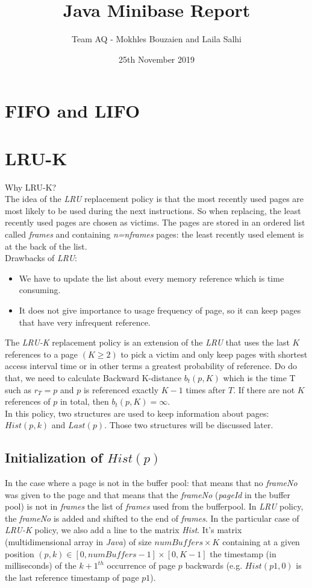 \documentclass{article}
\title{Java Minibase Report}
\author{Team AQ - Mokhles Bouzaien and Laila Salhi}
\date{25th November 2019}
\begin{document}
\maketitle

\section{FIFO and LIFO}


\section{LRU-K}
Why LRU-K?\\
The idea of the \textit{LRU} replacement policy is that the most recently used pages are most likely to be used during the next instructions. So when replacing, the least recently used pages are chosen as victims. The pages are stored in an ordered list called \textit{frames} and containing \textit{n=nframes} pages: the least recently used element is at the back of the list.\\
Drawbacks of \textit{LRU}:
\begin{itemize}
  \item We have to update the list about every memory reference which is time consuming.
  \item It does not give importance to usage frequency of page, so it can keep pages that have very infrequent reference.
\end{itemize}
The \textit{LRU-K} replacement policy is an extension of the \textit{LRU} that uses the last $K$ references to a page $(K\geq2)$ to pick a victim and only keep pages with shortest access interval time or in other terms a greatest probability of reference. Do do that, we need to calculate Backward K-distance $b_t(p,K)$ which is the time T such as $r_T=p$ and $p$ is referenced exactly $K-1$ times after $T$. If there are not $K$ references of $p$ in total, then $b_t(p,K)=\infty$.\\
In this policy, two structures are used to keep information about pages: $Hist(p,k)$ and $Last(p)$. Those two structures will be discussed later.

\subsection{Initialization of $Hist(p)$}

In the case where a page is not in the buffer pool: that means that no \textit{frameNo} was given to the page and that means that the \textit{frameNo} (\textit{pageId} in the buffer pool) is not in \textit{frames} the list of \textit{frames} used from the bufferpool. In \textit{LRU} policy, the \textit{frameNo} is added and shifted to the end of \textit{frames}. In the particular case of \textit{LRU-K} policy, we also add a line to the matrix \textit{Hist}. It's matrix (multidimensional array in \textit{Java}) of size $numBuffers \times K$ containing at a given position $(p,k) \in [0,numBuffers-1]\times[0,K-1]$ the timestamp (in milliseconds) of the ${k+1}^{th}$ occurrence of page $p$ backwards (e.g. $Hist(p1,0)$ is the last reference timestamp of page $p1$).


\citep{O'Neil1993}



\end{document}
